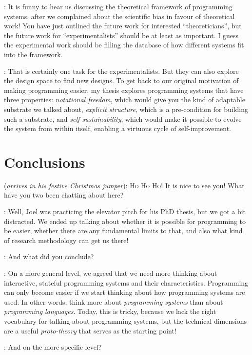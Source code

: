 \documentclass[runningheads]{llncs}
\newcommand{\T}{Tomas}
\newcommand{\J}{Joel}
\newcommand{\says}[2][gg]{\vspace{0.5em}\noindent\hangindent=0.5cm{\textsc{#1}}: #2}
\newcommand{\appears}[3][gg]{\vspace{0.5em}\noindent\hangindent=0.5cm{\textsc{#1}} (\emph{#2}): #3}
\begin{document}
\says[\T]{It is funny to hear us discussing the theoretical framework of programming systems, after we complained about the scientific bias in favour of theoretical work! You have just outlined the future work for interested ``theoreticians'', but the future work for ``experimentalists'' should be at least as important. I guess the experimental work should be filling the database of how different systems fit into the framework.}

\says[\J]{That is certainly one task for the experimentalists. But they can also explore the design space to find new designs. To get back to our original motivation of making programming easier, my thesis explores programming systems that have three properties: \emph{notational freedom}, which would give you the kind of adaptable substrate we talked about,
\emph{explicit structure}, which is a pre-condition for building such a substrate, and
\emph{self-sustainability}, which would make it possible to evolve the system from
within itself, enabling a virtuous cycle of self-improvement.}

\section{Conclusions}

\appears[Alan]{arrives in his festive Christmas jumper}{\textsc{Ho Ho Ho!} It is nice to see you! What have you two been chatting about here?}

\says[\T]{Well, Joel was practicing the elevator pitch for his PhD thesis, but we got a bit distracted. We ended up talking about whether it is possible for programming to be easier, whether there are any fundamental limits to that, and also what kind of research methodology can get us there!}

\says[Alan]{And what did you conclude?}

\says[\J]{On a more general level, we agreed that we need more thinking about interactive, stateful programming systems and their characteristics. Programming can only become easier if we start thinking about how programming systems are used. In other words, think more about \emph{programming systems} than about \emph{programming languages}. Today, this is tricky, because we lack the right vocabulary for talking about programming systems, but the technical dimensions are a useful \emph{proto-theory} that serves as the starting point!}

\says[Alan]{And on the more specific level?}
\end{document}
